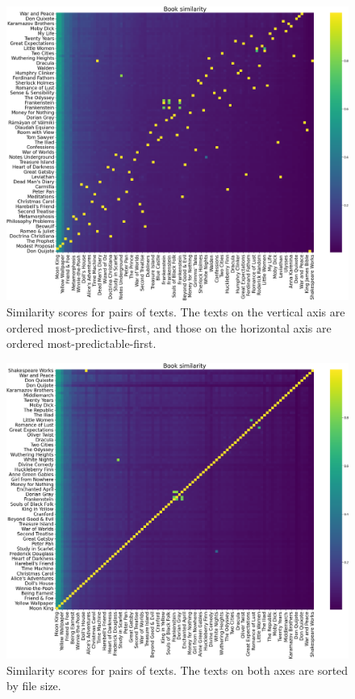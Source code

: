 \begin{figure}[t]
\centering
\includegraphics[width=\textwidth]{img/fig_co-compression_median.png}
\caption{Similarity scores for pairs of texts. The texts on the vertical axis are ordered most-predictive-first, and those on the horizontal axis are ordered most-predictable-first.}
\label{fig:heatmap_ppsort}
\end{figure}

\begin{figure}[t]
\centering
\includegraphics[width=\textwidth]{img/fig_co-compression_file_size.png}
\caption{Similarity scores for pairs of texts. The texts on both axes are sorted by file size.}
\label{fig:heatmap_fsort}
\end{figure}

